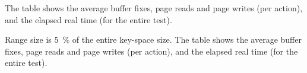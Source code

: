 \begin{table}[htb]
\begin{center}

% 
{The table shows the average buffer fixes, page reads and page writes (per
action), and the elapsed real time (for the entire test).}
\label{table:qu-del-50-100-summary-uniform}
\end{center}
\end{table}

\begin{table}[htb]
\begin{center}

{Range size is 5~\% of the entire key-space size.
The table shows the average buffer fixes, page reads and page writes (per
action), and the elapsed real time (for the entire test).}
\label{table:range-summary-uniform}
\end{center}
\end{table}
